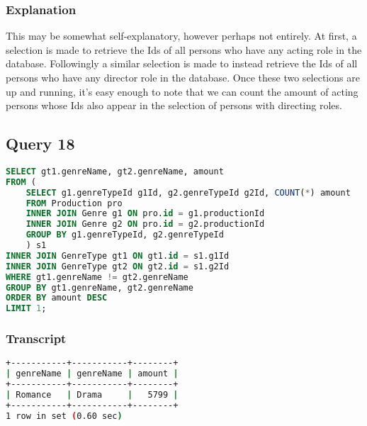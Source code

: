 \subsubsection{Explanation}
This may be somewhat self-explanatory, however perhaps not entirely. At first, a selection is made to retrieve the Ids of all persons who have any acting role in the database. Followingly a similar selection is made to instead retrieve the Ids of all persons who have any director role in the database. Once these two selections are up and running, it's easy enough to note that we can count the amount of acting persons whose Ids also appear in the selection of persons with directing roles. 


\subsection{Query 18}
\begin{lstlisting}[language=sql]
SELECT gt1.genreName, gt2.genreName, amount
FROM (
	SELECT g1.genreTypeId g1Id, g2.genreTypeId g2Id, COUNT(*) amount
	FROM Production pro
	INNER JOIN Genre g1 ON pro.id = g1.productionId
	INNER JOIN Genre g2 ON pro.id = g2.productionId
	GROUP BY g1.genreTypeId, g2.genreTypeId
	) s1
INNER JOIN GenreType gt1 ON gt1.id = s1.g1Id
INNER JOIN GenreType gt2 ON gt2.id = s1.g2Id
WHERE gt1.genreName != gt2.genreName
GROUP BY gt1.genreName, gt2.genreName
ORDER BY amount DESC
LIMIT 1;
\end{lstlisting}

\subsubsection{Transcript}
\begin{lstlisting}[language=bash]
+-----------+-----------+--------+
| genreName | genreName | amount |
+-----------+-----------+--------+
| Romance   | Drama     |   5799 |
+-----------+-----------+--------+
1 row in set (0.60 sec)
\end{lstlisting}

